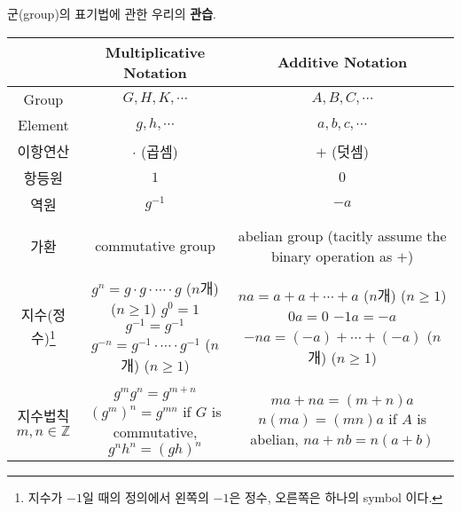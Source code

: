 \documentclass[12pt]{article}
\begin{document}
군(group)의 표기법에 관한 우리의 \textbf{관습}.\\
\begin{center}
	\begin{tabular}{c | c | c}
		& \textbf{Multiplicative Notation} & \textbf{Additive Notation} \\ \hline
		Group & $G, H, K, \cdots$ & $A, B, C, \cdots$ \\ \hline
		Element & $g, h, \cdots$ & $a, b, c, \cdots$ \\ \hline
		이항연산 & $\cdot$ (곱셈) & $+$ (덧셈) \\ \hline
		항등원 & $1$ & $0$ \\ \hline
		역원 & $g^{-1}$ & $-a$ \\ \hline &&\\[-1em]
		가환 & commutative group & \parbox[c]{8cm}{\centering abelian group\\(tacitly assume the binary operation as $+$)} \\[1em] \hline &&\\[-1em]
		지수(정수)\footnote{지수가 $-1$일 때의 정의에서 왼쪽의 $-1$은 정수, 오른쪽은 하나의 symbol 이다.} & \parbox[c]{8cm}{\centering $g^n = g \cdot g \cdot \cdots \cdot g$ ($n$개) ($n \geq 1$) \\ $g^0 = 1$ \\ $g^{-1} = g^{-1}$ \\ $g^{-n} = g^{-1} \cdot \cdots \cdot g^{-1}$ ($n$개) ($n \geq 1$)} & \parbox[c]{8cm}{\centering $na = a + a + \cdots + a$ ($n$개) ($n \geq 1$) \\ $0a = 0$ \\ $-1a = -a$ \\ $-na = (-a) + \cdots + (-a)$ ($n$개) ($n \geq 1$)} \\[3em] \hline &&\\[-1em]
		\parbox[c]{2cm}{\centering 지수법칙\\$m, n\in\mathbb{Z}$} & \parbox[c]{8cm}{\centering $g^mg^n = g^{m+n}$ \\ $(g^m)^n = g^{mn}$ \\ if $G$ is commutative, $g^nh^n = (gh)^n$ } & \parbox[c]{8cm}{\centering $ma+na=(m+n)a$ \\ $n(ma) = (mn)a$ \\ if $A$ is abelian, $na+nb = n(a+b)$} \\[2em] \hline
	\end{tabular}

\end{center}
\end{document}
